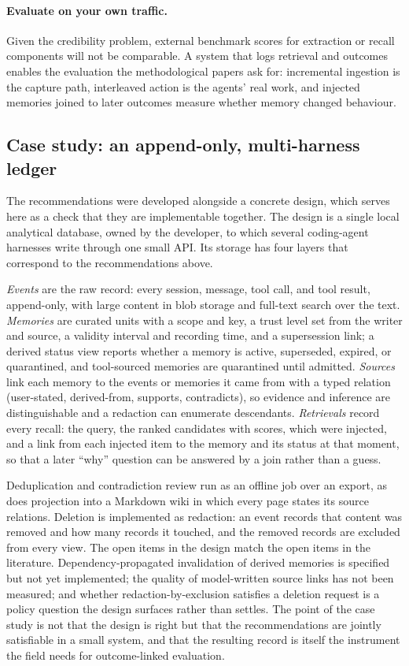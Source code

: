 \documentclass[11pt]{article}
\begin{document}
\paragraph{Evaluate on your own traffic.} Given the credibility problem, external benchmark scores for extraction or recall components will not be comparable. A system that logs retrieval and outcomes enables the evaluation the methodological papers ask for: incremental ingestion is the capture path, interleaved action is the agents' real work, and injected memories joined to later outcomes measure whether memory changed behaviour.

\subsection{Case study: an append-only, multi-harness ledger}

The recommendations were developed alongside a concrete design, which serves here as a check that they are implementable together. The design is a single local analytical database, owned by the developer, to which several coding-agent harnesses write through one small API. Its storage has four layers that correspond to the recommendations above.

\emph{Events} are the raw record: every session, message, tool call, and tool result, append-only, with large content in blob storage and full-text search over the text. \emph{Memories} are curated units with a scope and key, a trust level set from the writer and source, a validity interval and recording time, and a supersession link; a derived status view reports whether a memory is active, superseded, expired, or quarantined, and tool-sourced memories are quarantined until admitted. \emph{Sources} link each memory to the events or memories it came from with a typed relation (user-stated, derived-from, supports, contradicts), so evidence and inference are distinguishable and a redaction can enumerate descendants. \emph{Retrievals} record every recall: the query, the ranked candidates with scores, which were injected, and a link from each injected item to the memory and its status at that moment, so that a later ``why'' question can be answered by a join rather than a guess.

Deduplication and contradiction review run as an offline job over an export, as does projection into a Markdown wiki in which every page states its source relations. Deletion is implemented as redaction: an event records that content was removed and how many records it touched, and the removed records are excluded from every view. The open items in the design match the open items in the literature. Dependency-propagated invalidation of derived memories is specified but not yet implemented; the quality of model-written source links has not been measured; and whether redaction-by-exclusion satisfies a deletion request is a policy question the design surfaces rather than settles. The point of the case study is not that the design is right but that the recommendations are jointly satisfiable in a small system, and that the resulting record is itself the instrument the field needs for outcome-linked evaluation.
\end{document}
